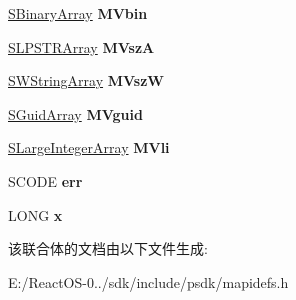 \begin{DoxyCompactItemize}
\hyperlink{struct___s_binary_array}{S\+Binary\+Array} {\bfseries M\+Vbin}
\item 
\mbox{\label{union___p_v_a3c6b7445b8818f370df9d3191c1d9a20}} 
\hyperlink{struct___s_l_p_s_t_r_array}{S\+L\+P\+S\+T\+R\+Array} {\bfseries M\+VszA}
\item 
\mbox{\label{union___p_v_a829cf894adcc5dd16353df7edd3b5f34}} 
\hyperlink{struct___s_w_string_array}{S\+W\+String\+Array} {\bfseries M\+VszW}
\item 
\mbox{\label{union___p_v_aa2714553e9496c050fa9b2d3c897736d}} 
\hyperlink{struct___s_guid_array}{S\+Guid\+Array} {\bfseries M\+Vguid}
\item 
\mbox{\label{union___p_v_abd9fc692c1e4fb037c20e31968ea3372}} 
\hyperlink{struct___s_large_integer_array}{S\+Large\+Integer\+Array} {\bfseries M\+Vli}
\item 
\mbox{\label{union___p_v_aa7cdca1c701fd9ee3f201fbe0c23251f}} 
S\+C\+O\+DE {\bfseries err}
\item 
\mbox{\label{union___p_v_ade41c0b4a95b37ac35ac58e0b4decfea}} 
L\+O\+NG {\bfseries x}
\end{DoxyCompactItemize}


该联合体的文档由以下文件生成\+:\begin{DoxyCompactItemize}
\item 
E\+:/\+React\+O\+S-\/0../sdk/include/psdk/mapidefs.\+h\end{DoxyCompactItemize}
